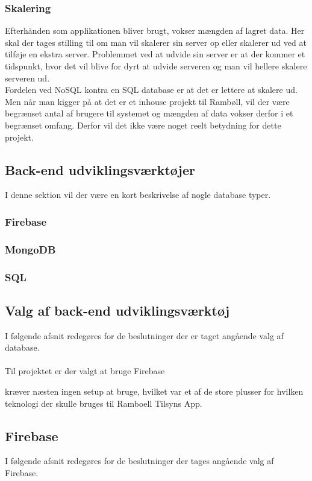 \subsubsection{Skalering}
Efterhånden som applikationen bliver brugt, vokser mængden af lagret data. Her skal der tages stilling til om man vil skalerer sin server op eller skalerer ud ved at tilføje en ekstra server. Problemmet ved at udvide sin server er at der kommer et tidspunkt, hvor det vil blive for dyrt at udvide serveren og man vil hellere skalere serveren ud. \\
Fordelen ved NoSQL kontra en SQL database er at det er lettere at skalere ud. Men
når man kigger på at det er et inhouse projekt til Rambøll, vil der være begrænset antal af brugere til systemet og mængden af data vokser derfor i et begrænset omfang. 
Derfor vil det ikke være noget reelt betydning for dette projekt.

\subsection{Back-end udviklingsværktøjer}
I denne sektion vil der være en kort beskrivelse af nogle database typer.

\subsubsection{Firebase}


\subsubsection{MongoDB}


\subsubsection{SQL}


\subsection{Valg af back-end udviklingsværktøj}
I følgende afsnit redegøres for de beslutninger der er taget angående valg af database. \\ \\
Til projektet er der valgt at bruge Firebase 

 kræver næsten ingen setup at bruge, hvilket var et af de store plusser for hvilken teknologi der skulle bruges til Ramboell Tilsyns App. 

\subsection{Firebase}
I følgende afsnit redegøres for de beslutninger der tages angående valg af Firebase. \\

